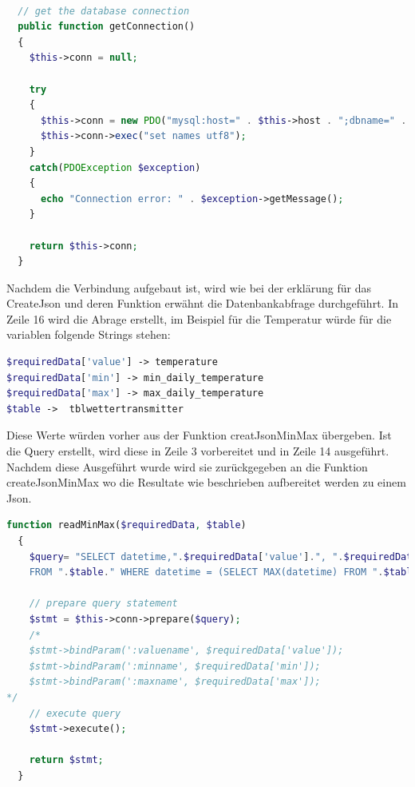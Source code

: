 \begin{lstlisting}[label=lst:database,caption=Beispiel Aufbau der Datenbankverbindung, language=php, style=php]

  // get the database connection
  public function getConnection()
  {
    $this->conn = null;

    try
    {
      $this->conn = new PDO("mysql:host=" . $this->host . ";dbname=" . $this->db_name, $this->username, $this->password);
      $this->conn->exec("set names utf8");
    }
    catch(PDOException $exception)
    {
      echo "Connection error: " . $exception->getMessage();
    }

    return $this->conn;
  }


\end{lstlisting}
Nachdem die Verbindung aufgebaut ist, wird wie bei der erklärung für das CreateJson und deren Funktion erwähnt die Datenbankabfrage durchgeführt. In Zeile 16 wird die Abrage erstellt, im Beispiel für die Temperatur würde für die variablen folgende Strings stehen:\\
\begin{lstlisting}[label=lst:createJson,caption=Beispiel erstellung des Jsons, language=php, style=php]
$requiredData['value'] -> temperature
$requiredData['min'] -> min_daily_temperature
$requiredData['max'] -> max_daily_temperature
$table ->  tblwettertransmitter
\end{lstlisting}
Diese Werte würden vorher aus der Funktion creatJsonMinMax übergeben. Ist die Query erstellt, wird diese in Zeile 3 vorbereitet und in Zeile 14 ausgeführt. Nachdem diese Ausgeführt wurde wird sie zurückgegeben an die Funktion createJsonMinMax wo die Resultate wie beschrieben aufbereitet werden zu einem Json.

\begin{lstlisting}[label=lst:createJson,caption=Beispiel erstellung des Jsons, language=php, style=php]
function readMinMax($requiredData, $table)
  {
    $query= "SELECT datetime,".$requiredData['value'].", ".$requiredData['min'].", ".$requiredData['max']."
    FROM ".$table." WHERE datetime = (SELECT MAX(datetime) FROM ".$table.");";

    // prepare query statement
    $stmt = $this->conn->prepare($query);
    /*
    $stmt->bindParam(':valuename', $requiredData['value']);
    $stmt->bindParam(':minname', $requiredData['min']);
    $stmt->bindParam(':maxname', $requiredData['max']);
*/
    // execute query
    $stmt->execute();

    return $stmt;
  }



\end{lstlisting}